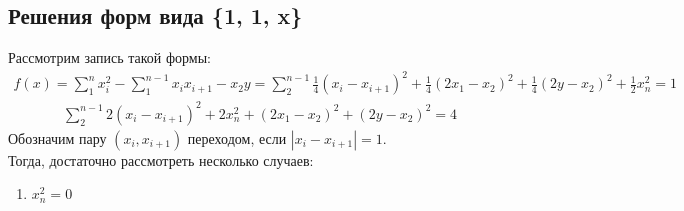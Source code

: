 \documentclass[12pt, a4paper]{article}
\begin{document}
{        \subsection{\large{Решения форм вида \{1, 1, x\}}}
             Рассмотрим запись такой формы:
            \begin{gather*}
            f(x)=\sum_1^n x_i^2 - \sum_1^{n-1} x_ix_{i+1} - x_2y = \sum_2^{n-1} \frac{1}{4}(x_i-x_{i+1})^2 +\frac{1}{4}(2x_1-x_2)^2 + \frac{1}{4}(2y-x_2)^2 + \frac{1}{2} x_n^2 = 1
            \end{gather*}
            \begin{gather*}
            \sum_2^{n-1} 2(x_i-x_{i+1})^2 + 2x_n^2 + (2x_1-x_2)^2+(2y-x_2)^2 = 4
            \end{gather*}
            Обозначим пару $(x_i, x_{i+1})$ переходом, если $|x_i-x_{i+1}| = 1$.\\
            Тогда, достаточно рассмотреть несколько случаев:\\
            \begin{enumerate}
                \item $x_n^2 = 0$
\end{enumerate}}
\end{document}

